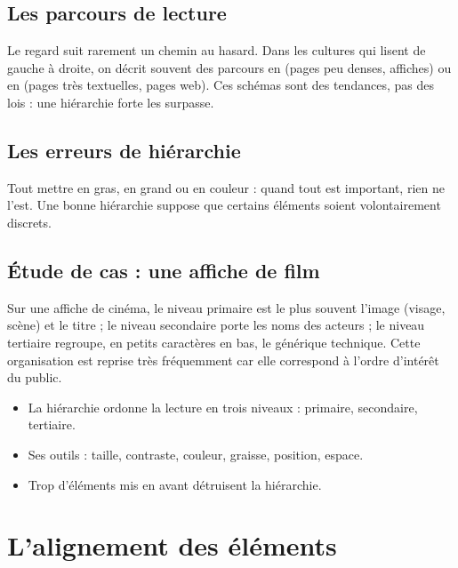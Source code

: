 \subsection{Les parcours de lecture}

Le regard suit rarement un chemin au hasard. Dans les cultures qui lisent de gauche à droite, on décrit souvent des parcours en  (pages peu denses, affiches) ou en  (pages très textuelles, pages web). Ces schémas sont des tendances, pas des lois : une hiérarchie forte les surpasse.

\subsection{Les erreurs de hiérarchie}

\begin{erreur}
Tout mettre en gras, en grand ou en couleur : quand tout est important, rien ne l'est. Une bonne hiérarchie suppose que certains éléments soient volontairement discrets.
\end{erreur}

\subsection{Étude de cas : une affiche de film}

Sur une affiche de cinéma, le niveau primaire est le plus souvent l'image (visage, scène) et le titre ; le niveau secondaire porte les noms des acteurs ; le niveau tertiaire regroupe, en petits caractères en bas, le générique technique. Cette organisation est reprise très fréquemment car elle correspond à l'ordre d'intérêt du public.

\begin{retenir}
\begin{itemize}
  \item La hiérarchie ordonne la lecture en trois niveaux : primaire, secondaire, tertiaire.
  \item Ses outils : taille, contraste, couleur, graisse, position, espace.
  \item Trop d'éléments mis en avant détruisent la hiérarchie.
\end{itemize}
\end{retenir}

\section{L'alignement des éléments}

